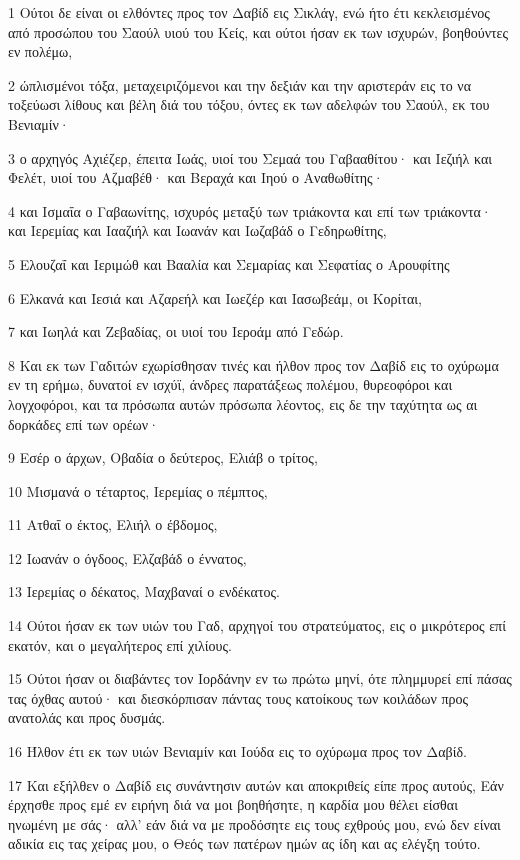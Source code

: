 \par 1 Ούτοι δε είναι οι ελθόντες προς τον Δαβίδ εις Σικλάγ, ενώ ήτο έτι κεκλεισμένος από προσώπου του Σαούλ υιού του Κείς, και ούτοι ήσαν εκ των ισχυρών, βοηθούντες εν πολέμω,
\par 2 ώπλισμένοι τόξα, μεταχειριζόμενοι και την δεξιάν και την αριστεράν εις το να τοξεύωσι λίθους και βέλη διά του τόξου, όντες εκ των αδελφών του Σαούλ, εκ του Βενιαμίν·
\par 3 ο αρχηγός Αχιέζερ, έπειτα Ιωάς, υιοί του Σεμαά του Γαβααθίτου· και Ιεζιήλ και Φελέτ, υιοί του Αζμαβέθ· και Βεραχά και Ιηού ο Αναθωθίτης·
\par 4 και Ισμαΐα ο Γαβαωνίτης, ισχυρός μεταξύ των τριάκοντα και επί των τριάκοντα· και Ιερεμίας και Ιααζιήλ και Ιωανάν και Ιωζαβάδ ο Γεδηρωθίτης,
\par 5 Ελουζαΐ και Ιεριμώθ και Βααλία και Σεμαρίας και Σεφατίας ο Αρουφίτης
\par 6 Ελκανά και Ιεσιά και Αζαρεήλ και Ιωεζέρ και Ιασωβεάμ, οι Κορίται,
\par 7 και Ιωηλά και Ζεβαδίας, οι υιοί του Ιεροάμ από Γεδώρ.
\par 8 Και εκ των Γαδιτών εχωρίσθησαν τινές και ήλθον προς τον Δαβίδ εις το οχύρωμα εν τη ερήμω, δυνατοί εν ισχύϊ, άνδρες παρατάξεως πολέμου, θυρεοφόροι και λογχοφόροι, και τα πρόσωπα αυτών πρόσωπα λέοντος, εις δε την ταχύτητα ως αι δορκάδες επί των ορέων·
\par 9 Εσέρ ο άρχων, Οβαδία ο δεύτερος, Ελιάβ ο τρίτος,
\par 10 Μισμανά ο τέταρτος, Ιερεμίας ο πέμπτος,
\par 11 Ατθαΐ ο έκτος, Ελιήλ ο έβδομος,
\par 12 Ιωανάν ο όγδοος, Ελζαβάδ ο έννατος,
\par 13 Ιερεμίας ο δέκατος, Μαχβαναί ο ενδέκατος.
\par 14 Ούτοι ήσαν εκ των υιών του Γαδ, αρχηγοί του στρατεύματος, εις ο μικρότερος επί εκατόν, και ο μεγαλήτερος επί χιλίους.
\par 15 Ούτοι ήσαν οι διαβάντες τον Ιορδάνην εν τω πρώτω μηνί, ότε πλημμυρεί επί πάσας τας όχθας αυτού· και διεσκόρπισαν πάντας τους κατοίκους των κοιλάδων προς ανατολάς και προς δυσμάς.
\par 16 Ήλθον έτι εκ των υιών Βενιαμίν και Ιούδα εις το οχύρωμα προς τον Δαβίδ.
\par 17 Και εξήλθεν ο Δαβίδ εις συνάντησιν αυτών και αποκριθείς είπε προς αυτούς, Εάν έρχησθε προς εμέ εν ειρήνη διά να μοι βοηθήσητε, η καρδία μου θέλει είσθαι ηνωμένη με σάς· αλλ' εάν διά να με προδόσητε εις τους εχθρούς μου, ενώ δεν είναι αδικία εις τας χείρας μου, ο Θεός των πατέρων ημών ας ίδη και ας ελέγξη τούτο.
